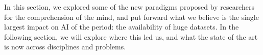 \documentclass[../main.tex]{subfiles}
\begin{document}
\vspace{5pt}
In this section, we explored some of the new paradigms proposed by researchers for the comprehension of the mind, and put forward what we believe is the single largest impact on AI of the period: the availability of huge datasets. In the following section, we will explore where this led us, and what the state of the art is now across disciplines and problems.
\end{document}
